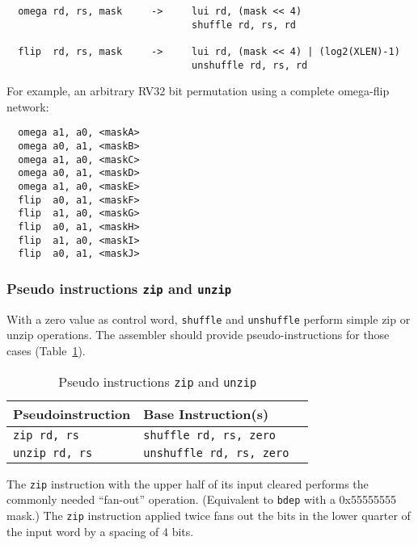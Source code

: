 \begin{verbatim}
  omega rd, rs, mask     ->     lui rd, (mask << 4)
                                shuffle rd, rs, rd

  flip  rd, rs, mask     ->     lui rd, (mask << 4) | (log2(XLEN)-1)
                                unshuffle rd, rs, rd
\end{verbatim}

For example, an arbitrary RV32 bit permutation using a complete omega-flip network:

\begin{verbatim}
  omega a1, a0, <maskA>
  omega a0, a1, <maskB>
  omega a1, a0, <maskC>
  omega a0, a1, <maskD>
  omega a1, a0, <maskE>
  flip  a0, a1, <maskF>
  flip  a1, a0, <maskG>
  flip  a0, a1, <maskH>
  flip  a1, a0, <maskI>
  flip  a0, a1, <maskJ>
\end{verbatim}

\subsubsection{Pseudo instructions {\tt zip} and {\tt unzip}}

With a zero value as control word, {\tt shuffle} and {\tt unshuffle} perform
simple zip or unzip operations. The assembler should provide pseudo-instructions
for those cases (Table~\ref{pseudos-zip-unzip}).

\begin{table}[h]
\begin{small}
\begin{center}
\begin{tabular}{l l l}
Pseudoinstruction & Base Instruction(s) \\ \hline
{\tt zip rd, rs} & {\tt shuffle rd, rs, zero} \\
{\tt unzip rd, rs} & {\tt unshuffle rd, rs, zero} \\
\hline

\end{tabular}
\end{center}
\end{small}
\caption{Pseudo instructions {\tt zip} and {\tt unzip}}
\label{pseudos-zip-unzip}
\end{table}

The \texttt{zip} instruction with the upper half of its input cleared performs
the commonly needed ``fan-out'' operation. (Equivalent to {\tt bdep} with a
0x55555555 mask.) The \texttt{zip} instruction applied twice fans out the bits
in the lower quarter of the input word by a spacing of 4 bits.

